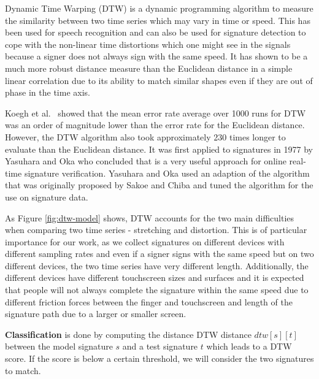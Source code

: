 \documentclass[a4paper, oneside]{csthesis}
\begin{document}
Dynamic Time Warping (DTW) is a dynamic programming algorithm to measure the similarity between two time series which may vary in time or speed. This has been used for speech recognition and can also be used for signature detection to cope with the non-linear time distortions which one might see in the signals because a signer does not always sign with the same speed. It has shown to be a much more robust distance measure than the Euclidean distance in a simple linear correlation \cite{Keogh:2000:SUD:347090.347153, 1030918, 1227706} due to its ability to match similar shapes even if they are out of phase in the time axis.

Koegh et al.~\cite{Keogh:2002:EID:1287369.1287405} showed that the mean error rate average over 1000 runs for DTW was an order of magnitude lower than the error rate for the Euclidean distance. However, the DTW algorithm also took approximately 230 times longer to evaluate than the Euclidean distance.
It was first applied to signatures in 1977 by Yasuhara and Oka \cite{yasuhara1977DTW} who concluded that is a very useful approach for online real-time signature verification. Yasuhara and Oka used an adaption of the algorithm that was originally proposed by Sakoe and Chiba \cite{1163055} and tuned the algorithm for the use on signature data.

As Figure \ref{fig:dtw-model} shows, DTW accounts for the two main difficulties when comparing two time series - stretching and distortion. This is of particular importance for our work, as we collect signatures on different devices with different sampling rates and even if a signer signs with the same speed but on two different devices, the two time series have very different length. Additionally, the different devices have different touchscreen sizes and surfaces and it is expected that people will not always complete the signature within the same speed due to different friction forces between the finger and touchscreen and length of the signature path due to a larger or smaller screen.



\textbf{Classification} is done by computing the distance DTW distance $dtw[s][t]$ between the model signature $s$ and a test signature $t$ which leads to a DTW score. If the score is below a certain threshold, we will consider the two signatures to match.
\end{document}
